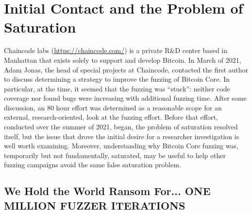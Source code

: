 \section{Initial Contact and the Problem of Saturation}

Chaincode labs (\url{https://chaincode.com/}) is a private R\&D center based in Manhattan that exists solely to support and develop Bitcoin.  In March of 2021, Adam Jonas, the head of special projects at Chaincode, contacted the first author to discuss determining a strategy to improve the fuzzing of Bitcoin Core.  In particular, at the time, it seemed that the fuzzing was ``stuck'': neither code coverage nor found bugs were increasing with additional fuzzing time.  After some discussion, an 80 hour effort was determined as a reasonable scope for an external, research-oriented, look at the fuzzing effort.  Before that effort, conducted over the summer of 2021, began, the problem of saturation resolved itself, but the issue that drove the initial desire for a researcher investigation is well worth examining.  Moreover, understanding why Bitcoin Core fuzzing was, temporarily but not fundamentally, saturated, may be useful to help other fuzzing campaigns avoid the same false saturation problem.

\subsection{We Hold the World Ransom For... ONE MILLION FUZZER ITERATIONS}